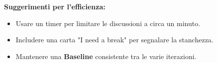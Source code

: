 \begin{notaslide}
\textbf{Suggerimenti per l'efficienza:}
\begin{itemize}
    \item Usare un timer per limitare le discussioni a circa un minuto.
    \item Includere una carta "I need a break" per segnalare la stanchezza.
    \item Mantenere una \textbf{Baseline} consistente tra le varie iterazioni.
\end{itemize}
\end{notaslide}